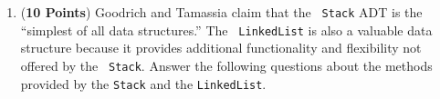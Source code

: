 \documentclass[12pt]{article}
\begin{document}
\begin{enumerate}
\begin{enumerate}




% 
\end{enumerate}

\newpage

\item ({\bf 10 Points}) Goodrich and Tamassia claim that the {\tt
  Stack} ADT is the ``simplest of all data structures.''  The {\tt
  LinkedList} is also a valuable data structure because it provides
  additional functionality and flexibility not offered by the {\tt
    Stack}.  Answer the following questions about the methods provided
  by the {\tt Stack} and the {\tt LinkedList}.

\begin{enumerate}


\end{enumerate}
\end{enumerate}
\end{document}
